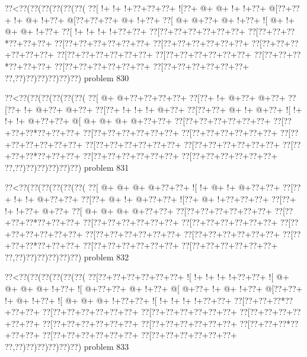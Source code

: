 \vbox{\vbox{\goo
\0??<\0??(\0??(\0??(\0??(\0??(\0??(
\0??[\- !+\- !+\- !+\0??+\0??+\0??+
\- ![\0??+\- @+\- @+\- !+\- !+\0??+
\- @[\0??+\0??+\- !+\- @+\- !+\0??+
\- @[\0??+\0??+\0??+\- @+\- !+\0??+
\0??[\- @+\- @+\0??+\- @+\- !+\0??+
\- ![\- @+\- !+\- @+\- @+\- !+\0??+
\0??[\- !+\- !+\- !+\- !+\0??+\0??+
\0??[\0??+\0??+\0??+\0??+\0??+\0??+
\0??[\0??+\0??+\0??*\0??+\0??+\0??+
\0??[\0??+\0??+\0??+\0??+\0??+\0??+
\0??[\0??+\0??+\0??+\0??+\0??+\0??+
\0??[\0??+\0??+\0??+\0??+\0??+\0??+
\0??[\0??+\0??+\0??+\0??+\0??+\0??+
\0??[\0??+\0??+\0??+\0??+\0??+\0??+
\0??[\0??+\0??+\0??*\0??+\0??+\0??+
\0??[\0??+\0??+\0??+\0??+\0??+\0??+
\0??[\0??+\0??+\0??+\0??+\0??+\0??+
\0??,\0??)\0??)\0??)\0??)\0??)\0??)
}
\hfil problem 830\hfil\break
}

\vbox{\vbox{\goo
\0??<\0??(\0??(\0??(\0??(\0??(\0??(
\0??[\- @+\- @+\0??+\0??+\0??+\0??+
\0??[\0??+\- !+\- @+\0??+\- @+\0??+
\0??[\0??+\- !+\- @+\0??+\- @+\0??+
\0??[\0??+\- !+\- !+\- !+\- @+\0??+
\0??[\0??+\0??+\- @+\- !+\- @+\0??+
\- ![\- !+\- !+\- !+\- @+\0??+\0??+
\- @[\- @+\- @+\- @+\- @+\0??+\0??+
\0??[\0??+\0??+\0??+\0??+\0??+\0??+
\0??[\0??+\0??+\0??*\0??+\0??+\0??+
\0??[\0??+\0??+\0??+\0??+\0??+\0??+
\0??[\0??+\0??+\0??+\0??+\0??+\0??+
\0??[\0??+\0??+\0??+\0??+\0??+\0??+
\0??[\0??+\0??+\0??+\0??+\0??+\0??+
\0??[\0??+\0??+\0??+\0??+\0??+\0??+
\0??[\0??+\0??+\0??*\0??+\0??+\0??+
\0??[\0??+\0??+\0??+\0??+\0??+\0??+
\0??[\0??+\0??+\0??+\0??+\0??+\0??+
\0??,\0??)\0??)\0??)\0??)\0??)\0??)
}
\hfil problem 831\hfil\break
}

\vbox{\vbox{\goo
\0??<\0??(\0??(\0??(\0??(\0??(\0??(
\0??[\- @+\- @+\- @+\- @+\0??+\0??+
\- ![\- !+\- @+\- !+\- @+\0??+\0??+
\0??[\0??+\- !+\- !+\- @+\0??+\0??+
\0??[\0??+\- @+\- !+\- @+\0??+\0??+
\- ![\0??+\- @+\- !+\0??+\0??+\0??+
\0??[\0??+\- !+\- !+\0??+\- @+\0??+
\0??[\- @+\- @+\- @+\- @+\0??+\0??+
\0??[\0??+\0??+\0??+\0??+\0??+\0??+
\0??[\0??+\0??+\0??*\0??+\0??+\0??+
\0??[\0??+\0??+\0??+\0??+\0??+\0??+
\0??[\0??+\0??+\0??+\0??+\0??+\0??+
\0??[\0??+\0??+\0??+\0??+\0??+\0??+
\0??[\0??+\0??+\0??+\0??+\0??+\0??+
\0??[\0??+\0??+\0??+\0??+\0??+\0??+
\0??[\0??+\0??+\0??*\0??+\0??+\0??+
\0??[\0??+\0??+\0??+\0??+\0??+\0??+
\0??[\0??+\0??+\0??+\0??+\0??+\0??+
\0??,\0??)\0??)\0??)\0??)\0??)\0??)
}
\hfil problem 832\hfil\break
}

\vbox{\vbox{\goo
\0??<\0??(\0??(\0??(\0??(\0??(\0??(
\0??[\0??+\0??+\0??+\0??+\0??+\0??+
\- ![\- !+\- !+\- !+\- !+\0??+\0??+
\- ![\- @+\- @+\- @+\- @+\- !+\0??+
\- ![\- @+\0??+\0??+\- @+\- !+\0??+
\- @[\- @+\0??+\- !+\- @+\- !+\0??+
\- @[\0??+\0??+\- !+\- @+\- !+\0??+
\- ![\- @+\- @+\- @+\- !+\0??+\0??+
\- ![\- !+\- !+\- !+\- !+\0??+\0??+
\0??[\0??+\0??+\0??*\0??+\0??+\0??+
\0??[\0??+\0??+\0??+\0??+\0??+\0??+
\0??[\0??+\0??+\0??+\0??+\0??+\0??+
\0??[\0??+\0??+\0??+\0??+\0??+\0??+
\0??[\0??+\0??+\0??+\0??+\0??+\0??+
\0??[\0??+\0??+\0??+\0??+\0??+\0??+
\0??[\0??+\0??+\0??*\0??+\0??+\0??+
\0??[\0??+\0??+\0??+\0??+\0??+\0??+
\0??[\0??+\0??+\0??+\0??+\0??+\0??+
\0??,\0??)\0??)\0??)\0??)\0??)\0??)
}
\hfil problem 833\hfil\break
}

